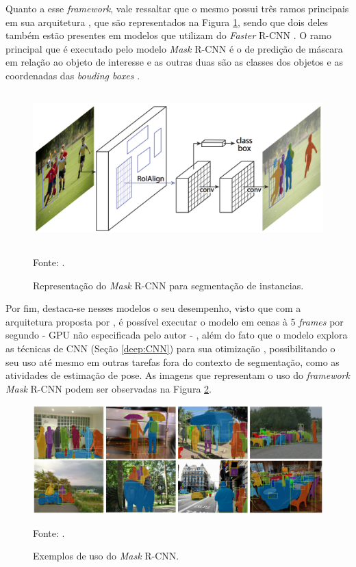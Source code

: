 Quanto a esse \textit{framework}, vale ressaltar que o mesmo possui três ramos principais em sua arquitetura \cite{He2020, Minaee2021}, que são representados na Figura \ref{instance:fig:2}, sendo que dois deles também estão presentes em modelos que utilizam do \textit{Faster} R-CNN \cite{Ren2017}. O ramo principal que é executado pelo modelo \textit{Mask} R-CNN é o de predição de máscara em relação ao objeto de interesse e as outras duas são as classes dos objetos e as coordenadas das \textit{bouding boxes} \cite{Minaee2021}.

\begin{figure}[H]
    \centering
    \caption{Representação do \textit{Mask} R-CNN para segmentação de instancias.}
    \includegraphics[height=2.3in]{recursos/imagens/instance/Mask-R-CNN_examp.png}
    \label{instance:fig:2}

    \vspace*{1 cm}
    Fonte: \cite{He2020}.
\end{figure}

Por fim, destaca-se nesses modelos o seu desempenho, visto que com a arquitetura proposta por \cite{He2020}, é possível executar o modelo em cenas à 5 \textit{frames} por segundo - GPU não especificada pelo autor - \cite{Minaee2021, He2020, Hafiz2020}, além do fato que o modelo explora as técnicas de CNN (Seção \ref{deep:CNN}) para sua otimização \cite{Li2020}, possibilitando o seu uso até mesmo em outras tarefas fora do contexto de segmentação, como as atividades de estimação de pose. As imagens que representam o uso do \textit{framework} \textit{Mask} R-CNN podem ser observadas na Figura \ref{instance:fig:3}.

\begin{figure}[H]
    \centering
    \caption{Exemplos de uso do \textit{Mask} R-CNN.}
    \includegraphics[width=1\textwidth]{recursos/imagens/instance/insta_examp.png}
    \label{instance:fig:3}

    \vspace*{1 cm}
    Fonte: \cite{He2020}.
\end{figure}


